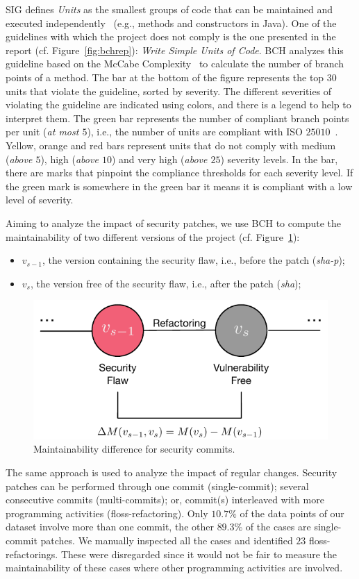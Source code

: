 \documentclass[smallextended]{svjour3}       %
\begin{document}
SIG defines \emph{Units} as the smallest groups of code that can be 
maintained and executed independently~\cite{Visser:2016:OREILLY} 
(e.g., methods and constructors in Java). One of the guidelines with 
which the project does not comply is the one presented in the report 
(cf. Figure~\ref{fig:bchrep}): \emph{Write Simple Units of Code}. BCH 
analyzes this guideline based on the McCabe 
Complexity~\cite{1702388} to calculate the number of branch points 
of a method. The bar at the bottom of the figure represents the top 
$30$ units that violate the guideline, sorted by severity. The 
different severities of violating the guideline are indicated using 
colors, and there is a legend to help to interpret them. The green 
bar represents the number of compliant branch points per unit 
(\emph{at most $5$}), i.e., the number of units are compliant with 
ISO $25010$~\cite{iso:2011}. Yellow, orange and red bars represent 
units that do not comply with medium (\emph{above $5$}), high 
(\emph{above $10$}) and very high (\emph{above $25$}) severity 
levels. In the bar, there are marks that pinpoint the compliance 
thresholds for each severity level. If the green mark is somewhere 
in the green bar it means it is compliant with a low level of
severity.

Aiming to analyze the impact of security patches, we use BCH to compute 
the maintainability of two different versions of the project 
(cf. Figure~\ref{fig:commit}):

\begin{itemize}
	\item $v_{s-1}$, the version containing the security flaw, i.e., 
	before the patch (\emph{sha-p});
	\item $v_{s}$, the version free of the security flaw, i.e., 
	after the patch (\emph{sha});
\end{itemize}

\begin{figure}[h]
 	\centering 	
	\includegraphics[width=0.5\linewidth]{figures/commit.pdf}
 	\caption{Maintainability difference for security commits.}
	\label{fig:commit}
\end{figure}

The same approach is used to analyze the impact of regular 
changes. Security patches can be performed through one commit (single-commit); 
several consecutive commits (multi-commits); or, commit(s) interleaved with more 
programming activities (floss-refactoring). Only $10.7\%$ of the data points 
of our dataset involve more than one commit, the other
$89.3\%$ of the cases are single-commit patches. We manually 
inspected all the cases and identified $23$ floss-refactorings. 
These were disregarded since it would not be fair to measure the 
maintainability of these cases where other programming activities 
are involved.
\end{document}
